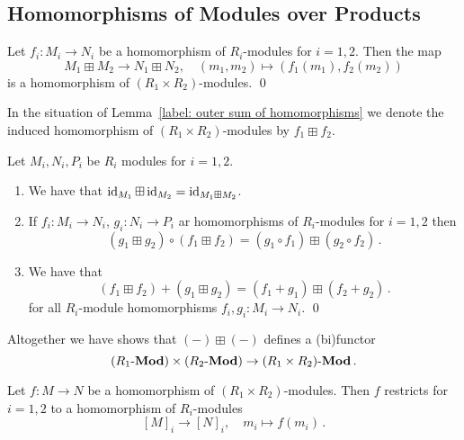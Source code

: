 \subsection{Homomorphisms of Modules over Products}


\begin{lemma}
  \label{label: outer sum of homomorphisms}
  Let $f_i \colon M_i \to N_i$ be a homomorphism of $R_i$-modules for $i = 1, 2$.
  Then the map
  \[
            M_1 \boxplus M_2
    \to     N_1 \boxplus N_2,
    \quad   (m_1, m_2)
    \mapsto (f_1(m_1), f_2(m_2))
  \]
  is a homomorphism of $(R_1 \times R_2)$-modules.
  \qed
\end{lemma}


\begin{definition}
  In the situation of Lemma~\ref{label: outer sum of homomorphisms} we denote the induced homomorphism of $(R_1 \times R_2)$-modules by $f_1 \boxplus f_2$.
\end{definition}


\begin{lemma}
  \label{lemma: boxplus is functorial}
  Let $M_i, N_i, P_i$ be $R_i$ modules for $i = 1, 2$.
  \begin{enumerate}
    \item
      We have that $\operatorname{id}_{M_1} \boxplus \operatorname{id}_{M_2} = \operatorname{id}_{M_1 \boxplus M_2}$.
    \item
      If $f_i \colon M_i \to N_i$, $g_i \colon N_i \to P_i$ ar homomorphisms of $R_i$-modules for $i = 1, 2$ then
      \[
          (g_1 \boxplus g_2) \circ (f_1 \boxplus f_2)
        = (g_1 \circ f_1) \boxplus (g_2 \circ f_2) \,.
      \]
    \item
      We have that
      \[
          (f_1 \boxplus f_2) + (g_1 \boxplus g_2)
        = (f_1 + g_1) \boxplus (f_2 + g_2) \,.
      \]
      for all $R_i$-module homomorphisms $f_i, g_i \colon M_i \to N_i$. 
    \qed
  \end{enumerate}
\end{lemma}


\begin{remark}
  \label{remark: functor out of product}
  Altogether we have shows that $(-) \boxplus (-)$ defines a (bi)functor
  \[
        (R_1\text{-}\mathbf{Mod}) \times (R_2\text{-}\mathbf{Mod})
    \to (R_1 \times R_2)\text{-}\mathbf{Mod} \,.
  \]
\end{remark}


\begin{lemma}
  \label{lemma: restrictions of homomorphisms}
  Let $f \colon M \to N$ be a homomorphism of $(R_1 \times R_2)$-modules.
  Then $f$ restricts for $i = 1, 2$ to a homomorphism of $R_i$-modules
  \[
            [M]_i
    \to     [N]_i,
    \quad   m_i
    \mapsto f(m_i) \,.
  \]
  
\end{lemma}


